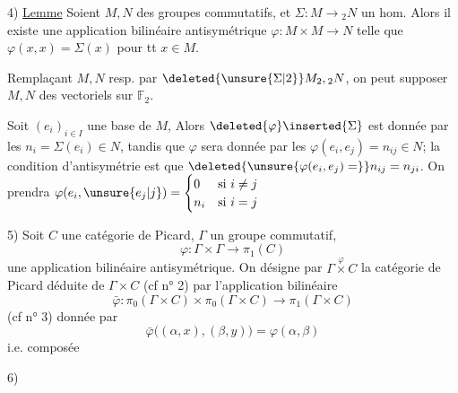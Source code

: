 4) \uline{Lemme} Soient $M,N$ des groupes commutatifs, et $\Sigma\colon M\longrightarrow {}_2N$ un hom. Alors il existe une application bilinéaire antisymétrique $\varphi\colon M\times M\longrightarrow N$ telle que $\varphi(x,x)=\Sigma(x)$ pour tt $x\in M$.

Remplaçant $M,N$ resp. par $\deleted{\unsure{\Sigma|2}}M_2,{}_2N$, on peut supposer $M,N$ des vectoriels  sur $\mathbb F_2$.

Soit $(e_i)_{i\in I}$ une base de $M$,  Alors $\deleted{\varphi}\inserted{\Sigma}$ est donnée par les $n_i=\Sigma(e_i)\in N$, tandis que $\varphi$ sera donnée par les $\varphi(e_i,e_j)=n_{ij}\in N$; la condition d'antisymétrie  est que $\deleted{\unsure{\varphi(e_i,e_j)=}} n_{ij}=n_{ji}$. On prendra $\varphi(e_i,\unsure{e_j|j})=\begin{cases}0&\text{si }i\ne j\\ n_i&\text{si }i=j\end{cases}$ 


5) Soit $C$ une catégorie de Picard, $\Gamma$ un groupe commutatif, \deleted{$\varphi$}
\[
\varphi\colon\Gamma\times\Gamma\longrightarrow\pi_1(C)
\]
une application bilinéaire antisymétrique. On désigne par $\Gamma\overset{\varphi}{\times}C$ la catégorie de Picard déduite de $\Gamma\times C$ (cf n° 2) par l'application bilinéaire 
\[
\bar\varphi\colon\pi_0(\Gamma\times C)\times\pi_0(\Gamma\times C)\longrightarrow\pi_1(\Gamma\times C)
\]
(cf n° 3) donnée par
\[
\bar\varphi\big((\alpha,x),(\beta,y)\big)=\varphi(\alpha,\beta)
\]
i.e. composée 

6)
